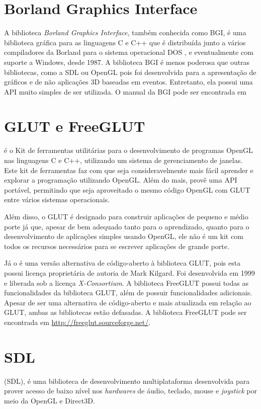 \documentclass[12pt, %
openright,
oneside, %
a4paper,    %
brazil]{facom-ufu-abntex2}
\begin{document}
\section{Borland Graphics Interface}
A biblioteca \textit{Borland Graphics Interface}, também conhecida como BGI, é uma biblioteca gráfica para as linguagens C e C++ que é distribuída junto a vários compiladores da Borland para o sistema operacional DOS \cite{BGI:Drivers}, e eventualmente com suporte a Windows, desde 1987. A biblioteca BGI é menos poderosa que outras bibliotecas, como a SDL ou OpenGL pois foi desenvolvida para a apresentação de gráficos e de não aplicações 3D baseadas em eventos. Entretanto, ela possui uma API muito simples de ser utilizada. O manual da BGI pode ser encontrada em 

\section{GLUT e FreeGLUT}
 é o Kit de ferramentas utilitárias para o desenvolvimento de programas OpenGL nas linguagens C e C++, utilizando um sistema de gerenciamento de janelas. Este kit de ferramentas faz com que seja consideravelmente mais fácil aprender e explorar a programação utilizando OpenGL. Além do mais, provê uma API portável, permitindo que seja aproveitado o mesmo código OpenGL com GLUT entre vários sistemas operacionais.

Além disso, o GLUT é designado para construir aplicações de pequeno e médio porte já que, apesar de bem adequado tanto para o aprendizado, quanto para o desenvolvimento de aplicações simples usando OpenGL, ele não é um kit com todos os recursos necessários para se escrever aplicações de grande porte.

Já o  é uma versão alternativa de código-aberto à biblioteca GLUT, pois esta possui licença proprietária de autoria de Mark Kilgard. Foi desenvolvida em 1999 e liberada sob a licença \textit{X-Consortium}. A biblioteca FreeGLUT possui todas as funcionalidades da biblioteca GLUT, além de possuir funcionalidades adicionais. Apesar de ser uma alternativa de código-aberto e mais atualizada em relação ao GLUT, ambas as bibliotecas estão defasadas. A biblioteca FreeGLUT pode ser encontrada em \url{http://freeglut.sourceforge.net/}.

\section{SDL}
 (SDL), é uma biblioteca de desenvolvimento multiplataforma desenvolvida para prover acesso de baixo nível nos \textit{hardwares} de áudio, teclado, mouse e \textit{joystick} por meio da OpenGL e Direct3D.
\end{document}
